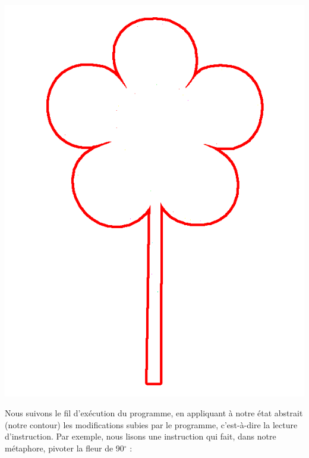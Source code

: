 \documentclass[french]{article}
\begin{document}
  
  \begin{center}
    \includegraphics[scale=0.19]{pictures/flower4.png}
  \end{center}
  
  Nous suivons le fil d'exécution du programme, en appliquant à notre état abstrait (notre contour) les modifications subies par le programme, c'est-à-dire la lecture d'instruction. Par exemple, nous lisons une instruction qui fait, dans notre métaphore, pivoter la fleur de 90$^{\circ}$ :  
  
\end{document}
